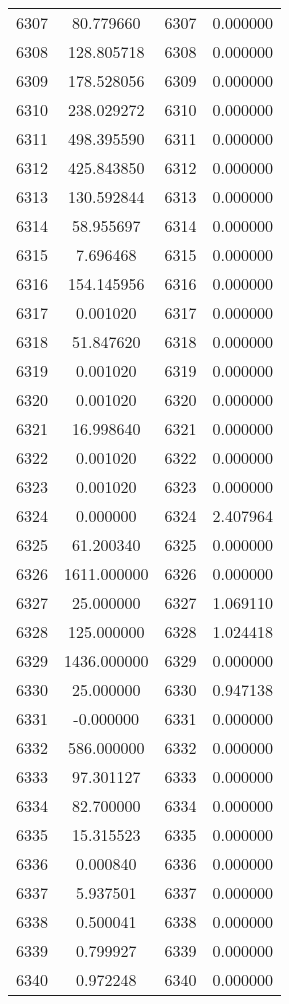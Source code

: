 \documentclass[12pt]{article}
\begin{document}
\begin{longtable}{@{}cccc@{}}
6307 & 80.779660 & 6307 & 0.000000 \\
6308 & 128.805718 & 6308 & 0.000000 \\
6309 & 178.528056 & 6309 & 0.000000 \\
6310 & 238.029272 & 6310 & 0.000000 \\
6311 & 498.395590 & 6311 & 0.000000 \\
6312 & 425.843850 & 6312 & 0.000000 \\
6313 & 130.592844 & 6313 & 0.000000 \\
6314 & 58.955697 & 6314 & 0.000000 \\
6315 & 7.696468 & 6315 & 0.000000 \\
6316 & 154.145956 & 6316 & 0.000000 \\
6317 & 0.001020 & 6317 & 0.000000 \\
6318 & 51.847620 & 6318 & 0.000000 \\
6319 & 0.001020 & 6319 & 0.000000 \\
6320 & 0.001020 & 6320 & 0.000000 \\
6321 & 16.998640 & 6321 & 0.000000 \\
6322 & 0.001020 & 6322 & 0.000000 \\
6323 & 0.001020 & 6323 & 0.000000 \\
6324 & 0.000000 & 6324 & 2.407964 \\
6325 & 61.200340 & 6325 & 0.000000 \\
6326 & 1611.000000 & 6326 & 0.000000 \\
6327 & 25.000000 & 6327 & 1.069110 \\
6328 & 125.000000 & 6328 & 1.024418 \\
6329 & 1436.000000 & 6329 & 0.000000 \\
6330 & 25.000000 & 6330 & 0.947138 \\
6331 & -0.000000 & 6331 & 0.000000 \\
6332 & 586.000000 & 6332 & 0.000000 \\
6333 & 97.301127 & 6333 & 0.000000 \\
6334 & 82.700000 & 6334 & 0.000000 \\
6335 & 15.315523 & 6335 & 0.000000 \\
6336 & 0.000840 & 6336 & 0.000000 \\
6337 & 5.937501 & 6337 & 0.000000 \\
6338 & 0.500041 & 6338 & 0.000000 \\
6339 & 0.799927 & 6339 & 0.000000 \\
6340 & 0.972248 & 6340 & 0.000000 \\

\end{longtable}
\end{document}
